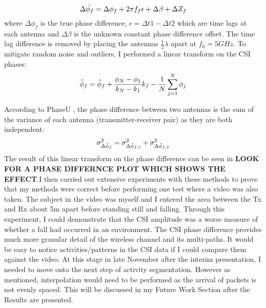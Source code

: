\begin{equation}\label{eqn:3.4}
    \Delta\hat{\phi_f} = \Delta\phi_{f}+2\pi f_{f}\epsilon  + \Delta\beta + \Delta Z_f
    \vspace{-11pt}
\end{equation}
where $\Delta\phi_{f}$ is the true phase difference, $\epsilon = \Delta t1 - \Delta t2$ which are time lags at each antenna and $\Delta\beta$ is the unknown constant phase difference offset. The time lag difference is removed by placing the antennas $\frac{1}{2}\lambda$ apart at $f_{0} = 5GHz$. To mitigate random noise and outliers, I performed a linear transform on the CSI phases: 
\vspace{-11pt}
\begin{equation}\label{eqn:3.5}
    \Tilde{\phi}_f = \hat{\phi}_{f}+\frac{\phi_{N}-\phi_{1}}{k_{N}-k_1}k_{f}-\frac{1}{N}\sum_{j=1}^{N} \phi_{j}
    \vspace{-11pt}
\end{equation} \par 
According to PhaseU \citep{PhaseU}, the phase difference between two antennas is the sum of the variance of each antenna (transmitter-receiver pair) as they are both independent:
\vspace{-11pt}
\begin{equation}\label{eqn:3.6}
    \sigma^{2}_{\Delta\Tilde{\phi}_f} = \sigma^{2}_{\Delta\Tilde{\phi}_{f,1}} + \sigma^{2}_{\Delta\Tilde{\phi}_{f,2}}
    \vspace{-11pt}
\end{equation} 
The result of this linear transform on the phase difference can be seen in \textbf{LOOK FOR A PHASE DIFFERNCE PLOT WHICH SHOWS THE EFFECT}.I then carried out extensive experiments with these methods to prove that my methods were correct before performing one test where a video was also taken. The subject in the video was myself and I entered the area between the Tx and Rx about 5m apart before standing still and falling. Through this experiment, I could demonstrate that the CSI amplitude was a worse measure of whether a fall had occurred in an environment. The CSI phase difference provides much more granular detail of the wireless channel and its multi-paths. It would be easy to notice activities/patterns in the CSI data if I could compare them against the video. At this stage in late November after the interim presentation, I needed to move onto the next step of activity segmentation. However as mentioned, interpolation would need to be performed as the arrival of packets is not evenly spaced. This will be discussed in my Future Work Section after the Results are presented. 

